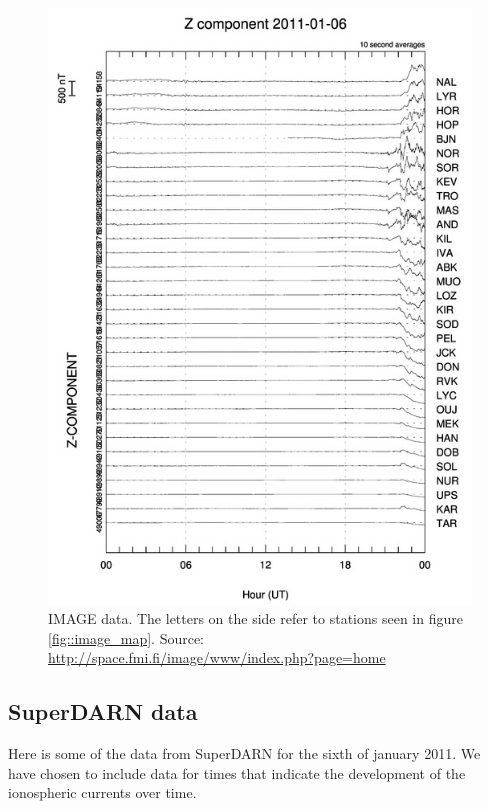 \documentclass[norsk,a4paper,12pt]{article}
\begin{document}
\begin{multicols}{2}
\begin{figure}[H]
	\includegraphics[scale = 0.9]{Figures/Z_gram.jpg}
	\centering
	\caption{IMAGE data. The letters on the side refer to stations seen in figure \ref{fig::image_map}. Source: \url{http://space.fmi.fi/image/www/index.php?page=home}}
	\label{fig:image_data}
\end{figure}

\subsection{SuperDARN data}
Here is some of the data from SuperDARN for the sixth of january 2011. We have chosen to include data for times that indicate the development of the ionospheric currents over time. 


\end{multicols}
\end{document}
